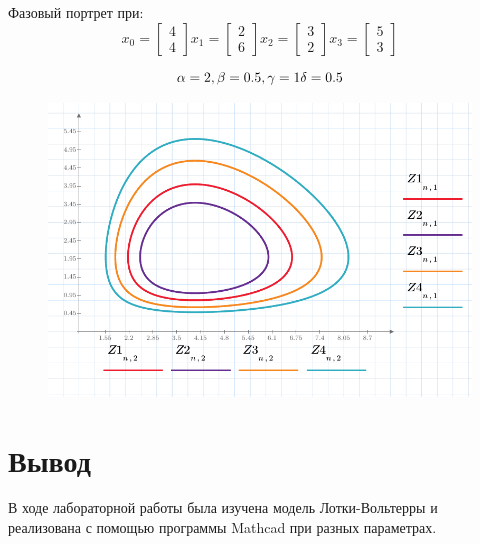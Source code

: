 \documentclass[a4paper, 14pt]{extarticle}
\begin{document}
		Фазовый портрет при:
		\noindent \[
					x_0 = \begin{bmatrix} 4 \\ 4 \end{bmatrix}
					x_1 = \begin{bmatrix} 2 \\ 6 \end{bmatrix} 
					x_2 = \begin{bmatrix} 3 \\ 2 \end{bmatrix} 
					x_3 = \begin{bmatrix} 5 \\ 3 \end{bmatrix} 
					\]
		
		\noindent\[
		\alpha = 2,\\
		\beta = 0.5,\\
		\gamma = 1\\
		\delta = 0.5
		\]
		\begin{figure}[H]
			\centering
			\includegraphics[width = \linewidth]{6.pdf}
			\caption[.] {}
		\end{figure}
	
	\section{Вывод}
		В ходе лабораторной работы была изучена модель Лотки-Вольтерры и реализована с помощью программы
		Mathcad при разных параметрах. 
		
\end{document}
